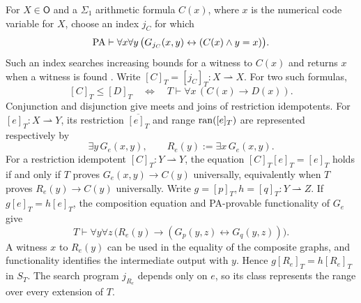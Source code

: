 For $X\in\mathsf O$ and a $\Sigma_1$ arithmetic formula $C(x)$,
where $x$ is the numerical code variable for $X$, choose
an index $j_C$ for which
\[
 \mathrm{PA}\vdash\forall x\forall y\,
 \bigl(G_{j_C}(x,y)\leftrightarrow(C(x)\land y=x)\bigr).
\]
Such an index searches increasing bounds for a witness to $C(x)$
and returns $x$ when a witness is found
\cite[p.~109, equation~$(*)$]{Montagna}. Write
$[C]_T=[j_C]_T:X\rightharpoonup X$.
For two such formulas,
\begin{equation}\label{eq:domain-order}
 [C]_T\le[D]_T
 \quad\Longleftrightarrow\quad
 T\vdash\forall x\,(C(x)\longrightarrow D(x)).
\end{equation}
Conjunction and disjunction give meets and joins of restriction
idempotents. For $[e]_T:X\rightharpoonup Y$, its restriction
$\overline{[e]_T}$ and range $\operatorname{ran}([e]_T)$ are represented respectively by
\[
 \exists y\,G_e(x,y),\qquad
 R_e(y):=\exists x\,G_e(x,y).
\]
For a restriction idempotent $[C]_T:Y\rightharpoonup Y$, the
equation $[C]_T[e]_T=[e]_T$ holds if and only if
$T$ proves $G_e(x,y)\to C(y)$ universally, equivalently when
$T$ proves $R_e(y)\to C(y)$ universally.
Write $g=[p]_T,h=[q]_T:Y\rightharpoonup Z$.
If $g[e]_T=h[e]_T$, the
composition equation and PA-provable functionality of $G_e$ give
\[
 T\vdash\forall y\forall z\,
 \bigl(R_e(y)\longrightarrow
       (G_p(y,z)\leftrightarrow G_q(y,z))\bigr).
\]
A witness $x$ to $R_e(y)$ can be used in the equality of
the composite graphs, and functionality identifies the intermediate
output with $y$. Hence $g[R_e]_T=h[R_e]_T$ in $S_T$.
The search program $j_{R_e}$ depends only on $e$, so its class
represents the range over every extension of $T$.

